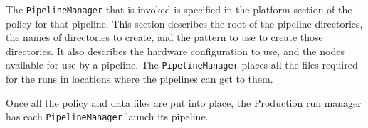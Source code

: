 The \texttt{PipelineManager} that is invoked is specified in the platform
section of the policy for that pipeline.  This section describes the root of the
pipeline directories, the names of directories to create, and the pattern to use
to create those directories.  It also describes the hardware configuration to
use, and the nodes available for use by a pipeline. The \texttt{PipelineManager}
places all the files required for the runs in locations where the pipelines can
get to them.

Once all the policy and data files are put into place, the Production run
manager has each \texttt{PipelineManager} launch its pipeline.
